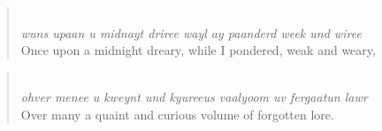 \begin{quote}\noindent {}\\[1pt]
\textit{wuns upaan u midnayt driree wayl ay paanderd week und wiree}\\[1pt]
Once upon a midnight dreary, while I pondered, weak and weary,
\end{quote}
\begin{quote}\noindent {}\\[1pt]
\textit{ohver menee u kweynt und kyureeus vaalyoom uv fergaatun lawr}\\[1pt]
Over many a quaint and curious volume of forgotten lore.
\end{quote}